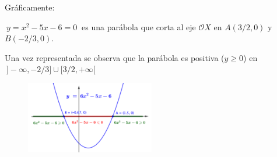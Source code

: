 \begin{multicols}{2}

Gráficamente: 

$\ y=x^2-5x-6=0\ $ es una parábola que corta al eje $\mathcal OX$ en $A(3/2,0)$ y $B(-2/3,0)$.

Una vez representada se observa que la parábola es positiva ($y\geqslant 0$) en $\ ]-\infty,-2/3]\cup[3/2,+\infty[$
\begin{figure}[H]
		\centering
		\includegraphics[width=0.5\textwidth]{img-ecc/ecc11.png}
	\end{figure}	
\end{multicols}

